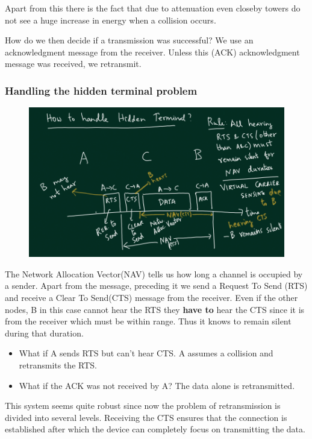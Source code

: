 \documentclass[12pt]{article}
\begin{document}
Apart from this there is the fact that due to attenuation even closeby towers do not 
see a huge increase in energy when a collision occurs. 


How do we then decide if a transmission was successful? We use an acknowledgment message from the receiver. 
Unless this (ACK) acknowledgment message was received, we retransmit. 

\subsubsection{Handling the hidden terminal problem}

\begin{figure}[H]
    \centering
    \includegraphics*[width=15cm]{Diagrams/hidden_terminal.png}
\end{figure}

The Network Allocation Vector(NAV) tells us how long a channel is occupied by a sender. 
Apart from the message, preceding it we send a Request To Send (RTS) and receive a Clear To Send(CTS) message from the 
receiver. Even if the other nodes, B in this case cannot hear the RTS they \textbf{have to} hear the CTS since it is from the 
receiver which must be within range. Thus it knows to remain silent during that duration. 

\begin{itemize}
    \item What if A sends RTS but can't hear CTS. A assumes a collision and retransmits the RTS. 
    \item What if the ACK was not received by A? The data alone is retransmitted. 
\end{itemize}

This system seems quite robust since now the problem of retransmission is divided into several levels. Receiving the 
CTS ensures that the connection is established after which the device can completely focus on transmitting the data. 
\end{document}
